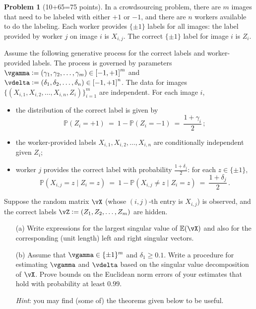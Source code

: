 \documentclass[11pt]{article}
\newcommand{\E}{\ensuremath{\mathbb{E}}} %
\renewcommand{\P}{\ensuremath{\mathbb{P}}} %
\theoremstyle{definition}
\newtheorem{problem}{Problem}
\begin{document}
\newpage


\begin{problem}[10+65=75 points]
  In a crowdsourcing problem, there are $m$ images that need to be labeled with
  either $+1$ or $-1$, and there are $n$ workers available to do the labeling.
  Each worker provides $\{\pm1\}$ labels for all images: the label provided by
  worker $j$ on image $i$ is $X_{i,j}$.
  The correct $\{\pm1\}$ label for image $i$ is $Z_i$.

  Assume the following generative process for the correct labels and
  worker-provided labels.
  The process is governed by parameters $\vgamma :=
  (\gamma_1,\gamma_2,\dotsc,\gamma_m) \in \intcc{-1,+1}^m$ and $\vdelta :=
  (\delta_1,\delta_2,\dotsc,\delta_n) \in \intcc{-1,+1}^n$.
  The data for images $\{ (X_{i,1},X_{i,2},\dotsc,X_{i,n},Z_i) \}_{i=1}^m$ are
  independent.
  For each image $i$,
  \begin{itemize}
    \item the distribution of the correct label is given by
      \begin{equation*}
        \P(Z_i = +1) \ = \ 1 - \P(Z_i = -1) \ = \ \frac{1+\gamma_i}{2}
        \,;
      \end{equation*}
    \item the worker-provided labels $X_{i,1}, X_{i,2}, \dotsc, X_{i,n}$ are
      conditionally independent given $Z_i$;
    \item worker $j$ provides the correct label with probability
      $\frac{1+\delta_j}{2}$: for each $z \in \{\pm1\}$,
      \begin{equation*}
        \P(X_{i,j} = z \mid Z_i = z)
        \ = \ 1 - \P(X_{i,j} \neq z \mid Z_i = z)
        \ = \ \frac{1+\delta_j}{2}
        \,.
      \end{equation*}
  \end{itemize}

  Suppose the random matrix $\vX$ (whose $(i,j)$-th entry is $X_{i,j}$) is
  observed, and the correct labels $\vZ := (Z_1, Z_2, \dotsc, Z_m)$ are hidden.
  \begin{enumerate}
    \item[(a)]
      Write expressions for the largest singular value of $\E(\vX)$ and also for
      the corresponding (unit length) left and right singular vectors.

    \item[(b)]
      Assume that $\vgamma \in \{\pm1\}^m$ and $\delta_1 \geq 0.1$.
      Write a procedure for estimating $\vgamma$ and $\vdelta$ based on the
      singular value decomposition of $\vX$.
      Prove bounds on the Euclidean norm errors of your estimates that hold with
      probability at least $0.99$.

      \emph{Hint}: you may find (some of) the theorems given below to be useful.

  \end{enumerate}

\end{problem}
\end{document}

